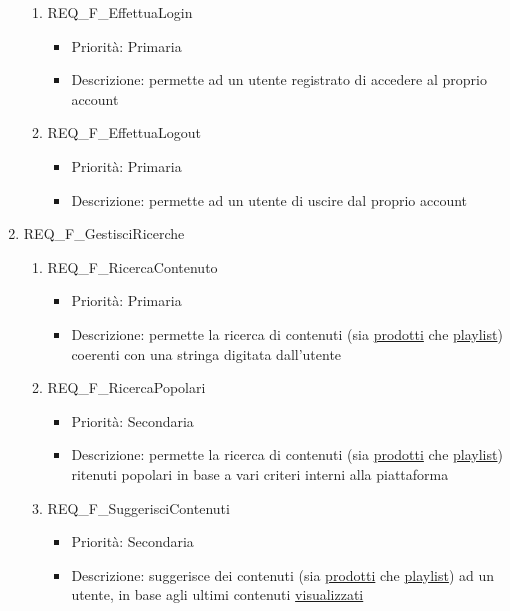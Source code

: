 \begin{enumerate}
\begin{enumerate}[label*=\arabic*.]
		\item REQ\_F\_EffettuaLogin
			\begin{itemize}	
			\item Priorità: Primaria
			\item Descrizione: permette ad un utente registrato di accedere al proprio account
			\end{itemize}

		\item REQ\_F\_EffettuaLogout
			\begin{itemize}	
			\item Priorità: Primaria
			\item Descrizione: permette ad un utente di uscire dal proprio account
			\end{itemize}
		\end{enumerate}

	\item REQ\_F\_GestisciRicerche
		\begin{enumerate}[label*=\arabic*.]
		\item REQ\_F\_RicercaContenuto
			\begin{itemize}	
			\item Priorità: Primaria
			\item Descrizione: permette la ricerca di contenuti (sia \hyperlink{AnReqProdMult}{prodotti} che \hyperlink{AnReqPlaylist}{playlist}) coerenti con una stringa digitata dall'utente
			\end{itemize}
		\item REQ\_F\_RicercaPopolari
			\begin{itemize}
			\item Priorità: Secondaria
			\item Descrizione: permette la ricerca di contenuti (sia \hyperlink{AnReqProdMult}{prodotti} che \hyperlink{AnReqPlaylist}{playlist}) ritenuti popolari in base a vari criteri interni alla piattaforma 
			\end{itemize}	
		
		\item REQ\_F\_SuggerisciContenuti
			\begin{itemize}	
			\item Priorità: Secondaria
			\item Descrizione: suggerisce dei contenuti (sia \hyperlink{AnReqProdMult}{prodotti} che \hyperlink{AnReqPlaylist}{playlist})  ad un utente, in base agli ultimi contenuti \hyperlink{AnReqVisual}{visualizzati}
			\end{itemize}
		\end{enumerate}		


\end{enumerate}
